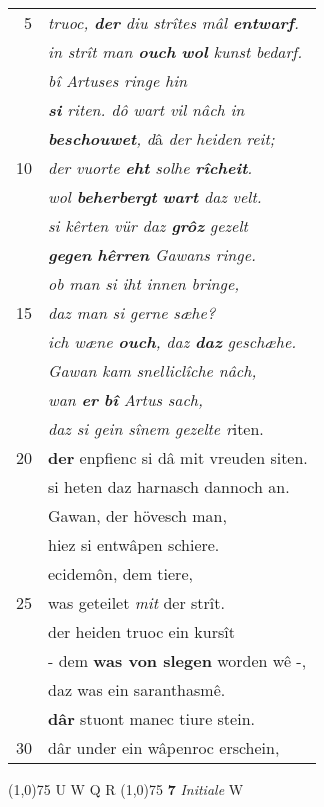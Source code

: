 \documentclass[8pt,a4paper,notitlepage]{article}
\begin{document}
\begin{table}[ht]
\begin{minipage}[t]{0.5\linewidth}
\begin{tabular}{rl}
5 & \textit{truoc, \textbf{der} diu strîtes mâl \textbf{entwarf}.}\\ 
 & \textit{in strît man \textbf{ouch} \textbf{wol} kunst bedarf.}\\ 
 & \textit{bî Artuses ringe hin}\\ 
 & \textit{\textbf{si} riten. dô wart vil nâch in}\\ 
 & \textit{\textbf{beschouwet}}\textit{, d}â \textit{der} \textit{heiden} \textit{reit;}\\ 
10 & \textit{der vuorte \textbf{eht} solhe \textbf{rîcheit}.}\\ 
 & \textit{wol \textbf{beherbergt} \textbf{wart} daz velt.}\\ 
 & \textit{si kêrten vür daz \textbf{grôz} gezelt}\\ 
 & \textit{\textbf{gegen} \textbf{hêrren} Gawans ringe.}\\ 
 & \textit{ob man si iht innen bringe,}\\ 
15 & \textit{daz man si gerne s}\textit{æ}\textit{he?}\\ 
 & \textit{ich wæne \textbf{ouch}, daz \textbf{daz} geschæhe.}\\ 
 & \textit{Gawan kam snelliclîche nâch,}\\ 
 & \textit{wan \textbf{er} \textbf{bî} Artus sach,}\\ 
 & \textit{daz si gein sînem gezelte r}iten.\\ 
20 & \textbf{der} enpfienc si dâ mit vreuden siten.\\ 
 & si heten daz harnasch dannoch an.\\ 
 & Gawan, der hövesch man,\\ 
 & hiez si entwâpen schiere.\\ 
 & ecidemôn, dem tiere,\\ 
25 & was geteilet \textit{mit} der strît.\\ 
 & der heiden truoc ein kursît\\ 
 & - dem \textbf{was von slegen} worden wê -,\\ 
 & daz was ein saranthasmê.\\ 
 & \textbf{dâr} stuont manec tiure stein.\\ 
30 & dâr under ein wâpenroc erschein,\\ 
\end{tabular}
\scriptsize
\line(1,0){75} \newline
U W Q R \newline
\line(1,0){75} \newline
\textbf{7} \textit{Initiale} W  \newline

\end{minipage}
\end{table}
\end{document}
